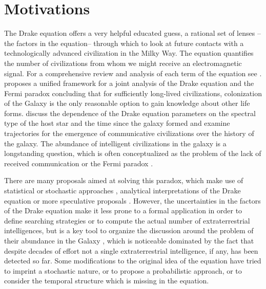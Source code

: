 \section{Motivations}\label{S_motivations}

The Drake equation \citep{drake_intelligent_1962}
offers a very helpful educated guess,
a rational set of lenses --the factors in the equation-- through which
to look at future contacts with a technologically advanced
civilization in the Milky Way.
%
The equation quantifies the number of
civilizations from whom we might receive an electromagnetic signal.
%
For a comprehensive review and analysis of each term of the equation
see \citet{vakoch_drake_2015}.
%
\citet{prantzos_joint_2013}
proposes a unified framework
for a joint analysis of the Drake equation and the Fermi paradox
concluding that for sufficiently long-lived civilizations,
colonization of the Galaxy is the only reasonable option to gain
knowledge about other life forms.
%
\citet{haqq-misra_drake_2017}
discuss the dependence of the Drake equation parameters on the
spectral type of the host star and the time since the galaxy formed
and examine trajectories for the emergence of communicative
civilizations over the history of the galaxy.
%
The abundance of
intelligent civilizations in the galaxy is a longstanding question,
which is often conceptualized as the problem of the lack of received
communication or the Fermi paradox 
\citep{barlow_galactic_2012, Sotos_biotechnology_2019,
forgan_galactic_2016}.



There are many proposals aimed at solving this paradox, which make use
of statistical \citep{solomonides_probabilistic_2016,
vanhouten_isthere_2017, horvat_calculating_2007,
maccone_statistical_2015} or stochastic approaches
\citep{forgan_numerical_2009, bloetscher_using_2019,
glade_stochastic_2011, forgan_numerical_2010}, analytical
interpretations of the Drake equation \citep{prantzos_joint_2013,
smith_broadcasting_2009} or more speculative proposals
\citep{barlow_galactic_2013, lampton_information_2013,
conway_three_2018, forgan_galactic_2017}.
%
\Fpagebreak
%
However,
the uncertainties in the factors of the Drake equation make
it less prone to a formal application in order to define searching
strategies or to compute the actual number of extraterrestrial
intelligences, but is a key tool
to organize the discussion around the problem of their abundance
in the Galaxy \citep{hinkel_interdisciplinary_2019}, which is
noticeable dominated by the fact that despite decades of effort not a
single extraterrestrial intelligence, if any, has been detected so far.
%
Some modifications to the original idea of the equation have tried to
imprint a stochastic nature, or to propose a probabilistic approach,
or to consider the temporal structure which is missing in the
equation.




